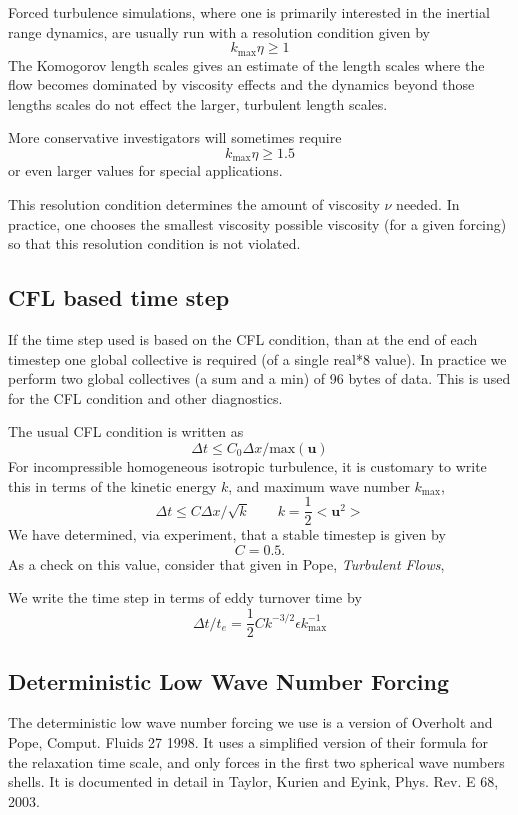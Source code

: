 \documentclass[12pt]{article}
\newcommand{\uv}{\mathbf u}
\begin{document}
Forced turbulence simulations, where one is primarily interested in
the inertial range dynamics, are usually run with a resolution condition
given by
\[
   k_\text{max} \eta \ge 1
\]
The Komogorov length scales gives an estimate of the length scales
where the flow becomes dominated by viscosity effects and the dynamics
beyond those lengths scales do not effect the larger, turbulent length
scales.

More conservative investigators will sometimes require
\[
   k_\text{max} \eta \ge 1.5
\]
or even larger values for special applications.  

This resolution condition determines the amount of viscosity $\nu$
needed.  In practice, one chooses the smallest viscosity possible
viscosity (for a given forcing) so that this resolution condition is
not violated.  






\subsection{CFL based time step}

If the time step used is based on the CFL condition, than at
the end of each timestep one global collective is required 
(of a single real*8 value).  In practice we perform two global collectives
(a sum and a min) of 96 bytes of data.  This is used for the CFL condition
and other diagnostics.  

The usual CFL condition is written as 
\[
\Delta t \le C_0  { \Delta x } / { \text{max} ( \uv ) }
\]
For incompressible homogeneous isotropic turbulence, it is customary
to write this in terms of the kinetic energy $k$, and maximum
wave number $k_\text{max}$,
\[
\Delta t \le C  { \Delta x } / { \sqrt{k} } \qquad k=\frac12 < \uv^2 >
\]
We have determined, via experiment, that a stable timestep is
given by 
\[
C=0.5.
\]  
As a check on this value, consider that given
in Pope, {\em Turbulent Flows},
\[
\]


We write the time step in terms of eddy turnover time by
\[
\Delta t / t_e =  \frac12 C k^{-3/2} \epsilon k_\text{max}^{-1}
\]

\subsection{Deterministic Low Wave Number Forcing}

The deterministic low wave number forcing we use is a version
of Overholt and Pope, Comput. Fluids 27 1998.  It uses a simplified
version of their formula for the relaxation time scale, and only forces
in the first two spherical wave numbers shells.
It is documented in detail in Taylor, Kurien and Eyink, Phys. Rev. E 68, 2003. 
\end{document}
